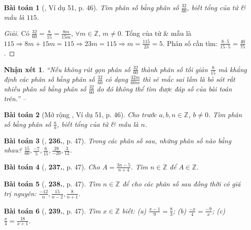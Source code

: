 \documentclass{article}
\numberwithin{equation}{section}
\newtheorem{baitoan}{Bài toán}
\newtheorem{nhanxet}{Nhận xét}[section]
\begin{document}
\begin{baitoan}[\cite{Tuyen_Toan_6}, Ví dụ 51, p. 46]
	Tìm phân số bằng phân số $\frac{32}{60}$, biết tổng của tử \& mẫu là $115$.
\end{baitoan}	

\begin{proof}[Giải]
	Có $\frac{32}{60} = \frac{8}{15} = \frac{8m}{15m}$, $\forall m\in\mathbb{Z}$, $m\ne0$. Tổng của tử \& mẫu là $115\Rightarrow8m + 15m = 115\Rightarrow23m = 115\Rightarrow m =\frac{115}{23} = 5$. Phân số cần tìm: $\frac{8\cdot5}{15\cdot5} = \frac{40}{75}$.
\end{proof}

\begin{nhanxet}
	``Nếu không rút gọn phân số $\frac{32}{60}$ thành phân số tối giản $\frac{8}{15}$ mà khẳng định các phân số bằng phân số $\frac{32}{60}$ có dạng $\frac{32m}{60m}$ thì sẽ mắc sai lầm là bỏ sót rất nhiều phân số bằng phân số $\frac{32}{60}$ do đó không thể tìm được đáp số của bài toán trên.'' -- \cite[p. 46]{Tuyen_Toan_6}
\end{nhanxet}

\begin{baitoan}[Mở rộng \cite{Tuyen_Toan_6}, Ví dụ 51, p. 46]
	Cho trước $a,b,n\in\mathbb{Z}$, $b\ne0$. Tìm phân số bằng phân số $\frac{a}{b}$, biết tổng của tử \& mẫu là $n$.
\end{baitoan}

\begin{baitoan}[\cite{Tuyen_Toan_6}, \textbf{236.}, p. 47]
	Trong các phân số sau, những phân số nào bằng nhau? $\frac{15}{60},\frac{-7}{5},\frac{6}{15},\frac{28}{-20},\frac{3}{12}$.
\end{baitoan}

\begin{baitoan}[\cite{Tuyen_Toan_6}, \textbf{237.}, p. 47]
	Cho $A = \frac{3n - 5}{n + 4}$. Tìm $n\in\mathbb{Z}$ để $A\in\mathbb{Z}$.
\end{baitoan}

\begin{baitoan}[\cite{Tuyen_Toan_6}, \textbf{238.}, p. 47]
	Tìm $n\in\mathbb{Z}$ để cho các phân số sau đồng thời có giá trị nguyên: $\frac{-12}{n},\frac{15}{n - 2},\frac{8}{n + 1}$.
\end{baitoan}

\begin{baitoan}[\cite{Tuyen_Toan_6}, \textbf{239.}, p. 47]
	Tìm $x\in\mathbb{Z}$ biết: (a) $\frac{x - 1}{9} = \frac{8}{3}$; (b) $\frac{-x}{4} = \frac{-9}{x}$; (c) $\frac{x}{4} = \frac{18}{x + 1}$.
\end{baitoan}
\end{document}
